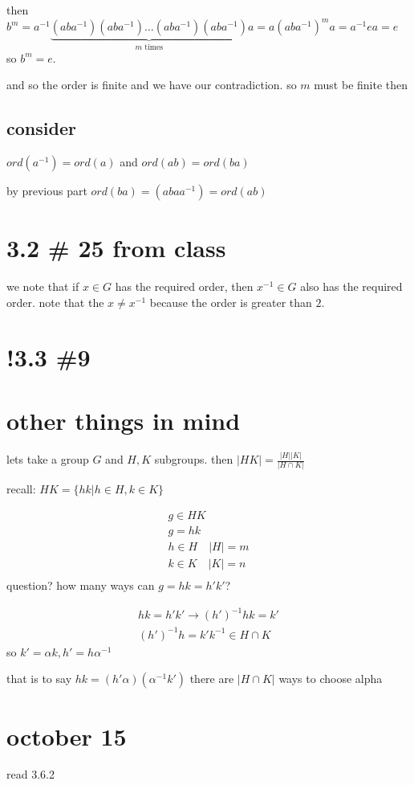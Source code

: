 \documentclass[letterpaper]{article}
\begin{document}
then $b^m=a^{-1}\underbrace{(aba^{-1})(aba^{-1})\dots(aba^{-1})(aba^{-1})}_{m\text{ times}}a=a(aba^{-1})^ma=a^{-1}ea=e$ so $b^m=e$.

and so the order is finite and we have our contradiction. so $m$ must be finite then
\subsection*{consider}
$ord(a^{-1})=ord(a)$ and $ord(ab)=ord(ba)$

by previous part $ord(ba)=(abaa^{-1})=ord(ab)$

\section*{3.2 \# 25 from class}
we note that if $x\in G$ has the required order, then $x^{-1}\in G$ also has the required order. note that the $x\ne x^{-1}$ because the order is greater than $2$.

\section*{!3.3 \#9}

\section*{other things in mind}
lets take a group $G$ and $H,K$ subgroups. then $\left\lvert HK\right\rvert=\frac{|H||K|}{|H\cap K|}$

recall: $HK=\{hk|h\in H, k\in K\}$

\begin{align*}
  g\in HK\\
  g=hk\\
  h\in H\quad |H|=m\\
  k\in K\quad |K|=n\\
\end{align*}
question? how many ways can $g=hk=h'k'$?

\begin{align*}
  hk=h'k'\to(h')^{-1}hk=k'\\
  (h')^{-1}h=k'k^{-1}\in H\cap K
\end{align*}
so $k'=\alpha k, h'=h\alpha^{-1}$

that is to say $hk=(h'\alpha)(\alpha^{-1}k')$
there are $|H\cap K|$ ways to choose alpha

\section*{october 15}
read 3.6.2
\end{document}
